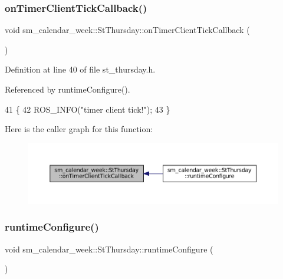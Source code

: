 \subsubsection{\texorpdfstring{on\+Timer\+Client\+Tick\+Callback()}{onTimerClientTickCallback()}}
{\footnotesize\ttfamily void sm\+\_\+calendar\+\_\+week\+::\+St\+Thursday\+::on\+Timer\+Client\+Tick\+Callback (\begin{DoxyParamCaption}{ }\end{DoxyParamCaption})\hspace{0.3cm}{\ttfamily [inline]}}



Definition at line 40 of file st\+\_\+thursday.\+h.



Referenced by runtime\+Configure().


\begin{DoxyCode}
41     \{
42         ROS\_INFO(\textcolor{stringliteral}{"timer client tick!"});
43     \}
\end{DoxyCode}
Here is the caller graph for this function\+:
\nopagebreak
\begin{figure}[H]
\begin{center}
\leavevmode
\includegraphics[width=350pt]{structsm__calendar__week_1_1StThursday_a70c4950d616a99cb68239fd9791e5c42_icgraph}
\end{center}
\end{figure}
\mbox{\label{structsm__calendar__week_1_1StThursday_a39b3ce105c15a814a3f4a01ad439ceb3}} 
\subsubsection{\texorpdfstring{runtime\+Configure()}{runtimeConfigure()}}
{\footnotesize\ttfamily void sm\+\_\+calendar\+\_\+week\+::\+St\+Thursday\+::runtime\+Configure (\begin{DoxyParamCaption}{ }\end{DoxyParamCaption})\hspace{0.3cm}{\ttfamily [inline]}}



